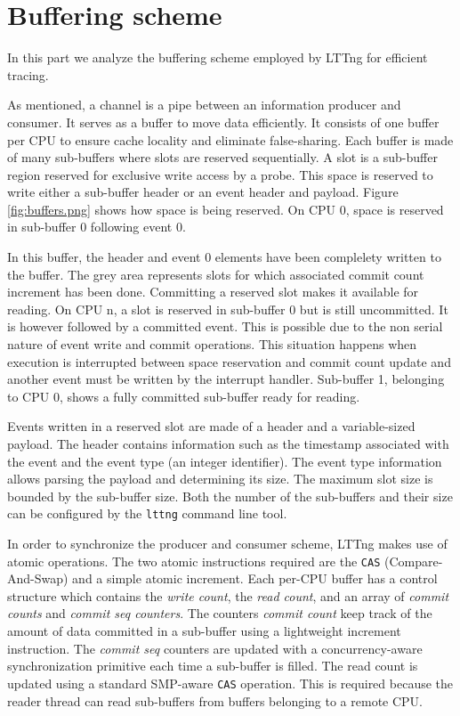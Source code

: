 \section{Buffering scheme}\label{sec:buffers}

In this part we analyze the buffering scheme employed by LTTng for efficient
tracing.

As mentioned, a channel is a pipe between an information producer and consumer.
It serves as a buffer to move data efficiently. It consists of one buffer per
CPU to ensure cache locality and eliminate false-sharing. Each buffer is made
of many sub-buffers where slots are reserved sequentially.  A slot is a
sub-buffer region reserved for exclusive write access by a probe.  This space
is reserved to write either a sub-buffer header or an event header and payload.
Figure \ref{fig:buffers.png} shows how space is being reserved. On CPU 0, space
is reserved in sub-buffer 0 following event 0. 


In this buffer, the header and event 0 elements have been complelety written to
the buffer. The grey area represents slots for which associated commit count
increment has been done. Committing a reserved slot makes it available for
reading. On CPU n, a slot is reserved in sub-buffer 0 but is still uncommitted.
It is however followed by a committed event. This is possible due to the non
serial nature of event write and commit operations. This situation happens when
execution is interrupted between space reservation and commit count update and
another event must be written by the interrupt handler.  Sub-buffer 1, belonging
to CPU 0, shows a fully committed sub-buffer ready for reading.


Events written in a reserved slot are made of a header and a variable-sized
payload. The header contains information such as the timestamp associated with
the event and the event type (an integer identifier). The event type
information allows parsing the payload and determining its size. The maximum
slot size is bounded by the sub-buffer size. Both the number of the sub-buffers
and their size can be configured by the \texttt{lttng} command line tool.

In order to synchronize the producer and consumer scheme, LTTng makes use of
atomic operations. The two atomic instructions required are the \texttt{CAS}
(Compare-And-Swap) and a simple atomic increment. Each per-CPU buffer has a
control structure which contains the \textit{write count}, the \textit{read
count}, and an array of \textit{commit counts} and \textit{commit seq counters}.
The counters \textit{commit count} keep track of the amount of data committed in
a sub-buffer using a lightweight increment instruction. The \textit{commit seq}
counters are updated with a concurrency-aware synchronization primitive each
time a sub-buffer is filled. The read count is updated using a standard
SMP-aware \texttt{CAS} operation. This is required because the reader thread can
read sub-buffers from buffers belonging to a remote CPU.

